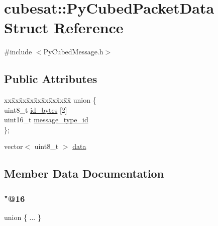 \hypertarget{structcubesat_1_1PyCubedPacketData}{}\section{cubesat\+:\+:Py\+Cubed\+Packet\+Data Struct Reference}
\label{structcubesat_1_1PyCubedPacketData}


{\ttfamily \#include $<$Py\+Cubed\+Message.\+h$>$}

\subsection*{Public Attributes}
\begin{DoxyCompactItemize}
\item 
\begin{tabbing}
xx\=xx\=xx\=xx\=xx\=xx\=xx\=xx\=xx\=\kill
union \{\\
\>uint8\_t \hyperlink{structcubesat_1_1PyCubedPacketData_ac838d716cfc7c6252dff158668b6291a}{id\_bytes} \mbox{[}2\mbox{]}\\
\>uint16\_t \hyperlink{structcubesat_1_1PyCubedPacketData_a02926763ed43d1a5fea510f63644b5cf}{message\_type\_id}\\
\}; \\

\end{tabbing}\item 
vector$<$ uint8\+\_\+t $>$ \hyperlink{structcubesat_1_1PyCubedPacketData_a078edbf1fbb4ca6a89a6bacb8e78cdc2}{data}
\end{DoxyCompactItemize}


\subsection{Member Data Documentation}
\mbox{\label{structcubesat_1_1PyCubedPacketData_a6daf046ad7c04e04066aff8a637babb0}} 
\subsubsection{\texorpdfstring{"@16}{@16}}
{\footnotesize\ttfamily union \{ ... \} }

\mbox{\label{structcubesat_1_1PyCubedPacketData_a078edbf1fbb4ca6a89a6bacb8e78cdc2}} 
